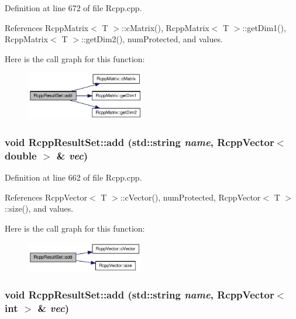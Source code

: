 Definition at line 672 of file Rcpp.cpp.

References RcppMatrix$<$ T $>$::cMatrix(), RcppMatrix$<$ T $>$::getDim1(), RcppMatrix$<$ T $>$::getDim2(), numProtected, and values.

Here is the call graph for this function:\nopagebreak
\begin{figure}[H]
\begin{center}
\leavevmode
\includegraphics[width=146pt]{classRcppResultSet_56f1bff720a6cf6503ab942bdb6892b3_cgraph}
\end{center}
\end{figure}
\hypertarget{classRcppResultSet_10a64eb042cd3bac5b635670ae2fff5d}{
\subsubsection[{add}]{\setlength{\rightskip}{0pt plus 5cm}void RcppResultSet::add (std::string {\em name}, \/  {\bf RcppVector}$<$ double $>$ \& {\em vec})}}
\label{classRcppResultSet_10a64eb042cd3bac5b635670ae2fff5d}




Definition at line 662 of file Rcpp.cpp.

References RcppVector$<$ T $>$::cVector(), numProtected, RcppVector$<$ T $>$::size(), and values.

Here is the call graph for this function:\nopagebreak
\begin{figure}[H]
\begin{center}
\leavevmode
\includegraphics[width=145pt]{classRcppResultSet_10a64eb042cd3bac5b635670ae2fff5d_cgraph}
\end{center}
\end{figure}
\hypertarget{classRcppResultSet_068cb13e27c0e26dd05e92d67eaeb7d0}{
\subsubsection[{add}]{\setlength{\rightskip}{0pt plus 5cm}void RcppResultSet::add (std::string {\em name}, \/  {\bf RcppVector}$<$ int $>$ \& {\em vec})}}
\label{classRcppResultSet_068cb13e27c0e26dd05e92d67eaeb7d0}




